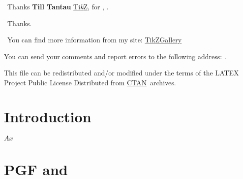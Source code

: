 \documentclass[DIV         = 12,
               fontsize    = 10,
               headinclude = false,
               index       = totoc,
               footinclude = false,
               twoside,
			   totoc,
               headings    = small]{tkz-doc}
\begin{document}
\title{\nameofpack}
\date{\today}
\clearpage
\thispagestyle{empty}

\ifpgfnotitlebg
\else
	\maketitle
\fi

\clearpage


\pagecolor{fondpaille}
\color{Maroon}

\nameoffile{\nameofpack}


\presentation

\vspace*{1cm}
\noindent\lefthand\ Thanks \textbf{Till Tantau} \href{http://sourceforge.net/projects/pgf/}{Ti\emph{k}Z},  for , .

\vspace*{12pt}
\noindent\lefthand\ Thanks.

\vspace*{12pt}
\noindent\lefthand\ You can find more information from my site:
\href{http://khaos.github.com/TikZGallery}{TikZGallery}

\vfill 
You can send your comments and report errors to the following address: \href{\authoremail}{\textcolor{blue}{\authorofpack}}.
 
This file can be redistributed and/or modified under the terms of the LATEX 
Project Public License Distributed from \href{http://www.ctan.org/}{CTAN}\  archives.

\clearpage\newpage

\tableofcontents{}

\clearpage\newpage

\setlength{\parskip}{1ex plus 0.5ex minus 0.2ex} 


\section{Introduction} %
\label{sec:introduction}

\lipsum[1-7]

$Ax$


\clearpage

\section{PGF and \TIKZ{}} %
\label{sec:pgf_and_tikz}
\end{document}
